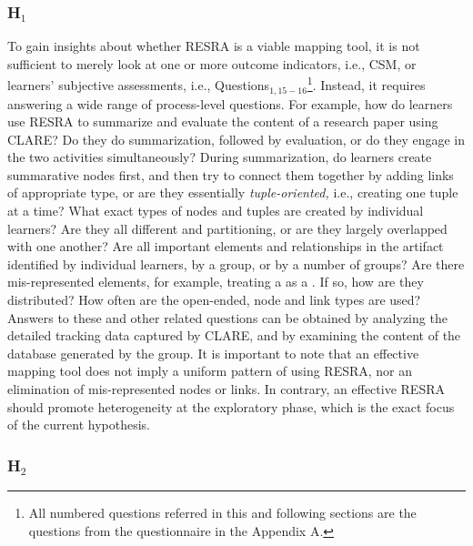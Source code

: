 \subsubsection{H\(_1\)}
\label{sec:resra1 data}

To gain insights about whether RESRA is a viable mapping tool, it is not
sufficient to merely look at one or more outcome indicators, i.e., CSM, or
learners' subjective assessments, i.e., Questions\(_{1,
15-16}\)\footnote{All numbered questions referred in this and following
sections are the questions from the questionnaire in the Appendix
A.}. Instead, it requires answering a wide range of process-level
questions. For example, how do learners use RESRA to summarize and evaluate
the content of a research paper using CLARE? Do they do summarization,
followed by evaluation, or do they engage in the two activities
simultaneously? During summarization, do learners create summarative nodes
first, and then try to connect them together by adding links of appropriate
type, or are they essentially {\it tuple-oriented,\/} i.e., creating one
tuple at a time? What exact types of nodes and tuples are created by
individual learners? Are they all different and partitioning, or are they
largely overlapped with one another? Are all important elements and
relationships in the artifact identified by individual learners, by a
group, or by a number of groups?  Are there mis-represented elements, for
example, treating a  as a .  If
so, how are they distributed? How often are the open-ended, node and link
types are used? Answers to these and other related questions can be
obtained by analyzing the detailed tracking data captured by CLARE, and by
examining the content of the database generated by the group. It is
important to note that an effective mapping tool does not imply a uniform
pattern of using RESRA, nor an elimination of mis-represented nodes or
links.  In contrary, an effective RESRA should promote heterogeneity at the
exploratory phase, which is the exact focus of the current hypothesis.


\subsubsection{H\(_2\)}
\label{sec:resra2 data}

